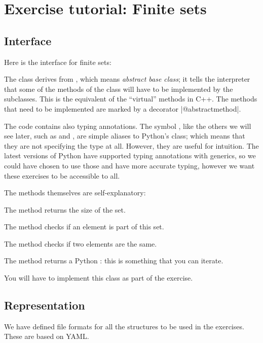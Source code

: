 \section{Exercise tutorial: Finite sets}\label{sec:exercise-tutorial}

\subsection*{Interface}
Here is the interface for finite sets:
%

The class derives from , which means \emph{abstract base class}; it tells the interpreter
that some of the methods of the class will have to be implemented by the subclasses. This is the equivalent
of the ``virtual'' methods in C++.
The methods that need to be implemented are marked by a decorator \pystr|@abstractmethod|.


The code contains also typing annotations.
The symbol , like the others we will see later, such as  and , are simple aliases to Python's  class; which means that they are not specifying the type at all.
However, they are useful for intuition.
The latest versions of Python have supported typing annotations with generics, so we could have chosen to use those and have more accurate typing, however we want these exercises to be accessible to all.

The methods themselves are self-explanatory:

\begin{compactitem}
  \item The method  returns the size of the set.
  \item The method  checks if an element is part of this set.
  \item The method  checks if two elements are the same.
  \item The method  returns a Python : this is something that you can iterate.
\end{compactitem}

You will have to implement this class as part of the exercise.


\subsection*{Representation}

We have defined file formats for all the structures to be used in the exercises.
These are based on YAML\@.


